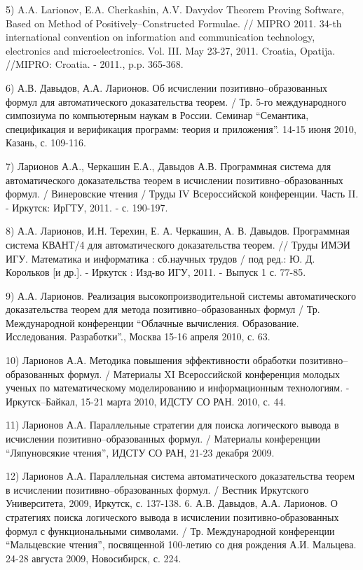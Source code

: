 \documentclass[a4paper]{report}
\begin{document}
5) A.A. Larionov, E.A. Cherkashin, A.V. Davydov Theorem Proving
Software, Based on Method of Positively--Constructed Formulae. // MIPRO
2011. 34-th international convention on information and communication
technology, electronics and microelectronics. Vol. III. May 23-27,
2011. Croatia, Opatija. //MIPRO: Croatia. - 2011., p.p. 365-368.

6) А.В. Давыдов, А.А. Ларионов. Об исчислении позитивно--образованных
формул для автоматического доказательства теорем. / Тр. 5-го
международного симпозиума по компьютерным наукам в России. Семинар
``Семантика, спецификация и верификация программ: теория и приложения''.
14-15 июня 2010, Казань, с. 109-116.

7) Ларионов А.А., Черкашин Е.А., Давыдов А.В. Программная система для
автоматического доказательства теорем в исчислении
позитивно--образованных формул. / Винеровские чтения / Труды IV
Всероссийской конференции. Часть II. - Иркутск: ИрГТУ, 2011. - с.
190-197.

8) А.А. Ларионов, И.Н. Терехин, Е. А. Черкашин, А. В. Давыдов.
Программная система КВАНТ/4 для автоматического доказательства теорем.
// Труды ИМЭИ ИГУ. Математика и информатика : сб.научных трудов / под
ред.: Ю. Д. Корольков [и др.]. - Иркутск : Изд-во ИГУ, 2011. - Выпуск
1 с. 77-85.

9) А.А. Ларионов. Реализация высокопроизводительной системы
автоматического доказательства теорем для метода
позитивно--образованных формул / Тр. Международной конференции
``Облачные вычисления. Образование. Исследования. Разработки''., Москва
15-16 апреля 2010,  с. 63.

10) Ларионов А.А. Методика повышения эффективности обработки
позитивно--образованных формул. / Материалы XI Всероссийской
конференция молодых ученых по математическому моделированию и
информационным технологиям. - Иркутск--Байкал, 15-21 марта 2010,  ИДСТУ
СО РАН.  2010, с. 44.

11) Ларионов А.А. Параллельные стратегии для поиска логического вывода
в исчислении позитивно--образованных формул. / Материалы конференции
``Ляпуновсякие чтения'', ИДСТУ СО РАН,  21-23 декабря 2009.

12) Ларионов А.А. Параллельная система автоматического доказательства
теорем в исчислении позитивно--образованных формул. / Вестник
Иркутского Университета, 2009, Иркутск, с. 137-138.
6. А.В. Давыдов, А.А. Ларионов. О стратегиях поиска логического вывода
в исчислении позитивно-образованных формул с функциональными
символами. / Тр. Международной конференции ``Мальцевские чтения'',
посвященной 100-летию со дня рождения А.И. Мальцева. 24-28 августа
2009, Новосибирск, с. 224.
\end{document}
